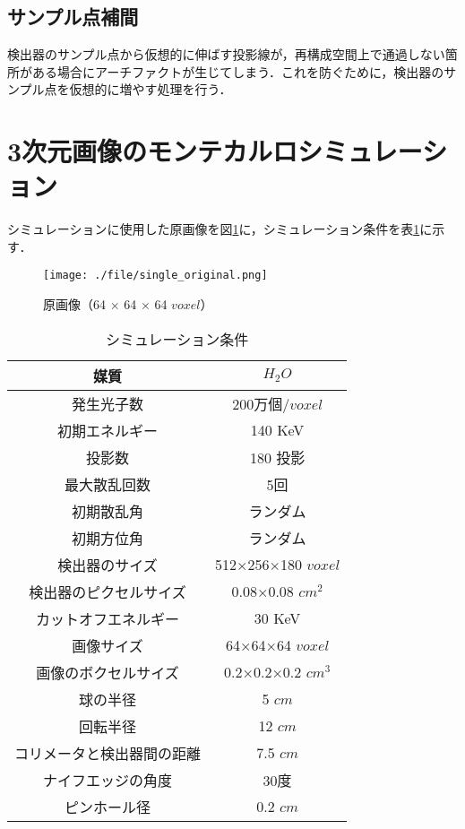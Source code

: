 \documentclass[dvipdfmx,autodetect-engine,twocolumn,10pt]{jsarticle}%
\begin{document}
\subsection{サンプル点補間}
検出器のサンプル点から仮想的に伸ばす投影線が，再構成空間上で通過しない箇所がある場合にアーチファクトが生じてしまう．これを防ぐために，検出器のサンプル点を仮想的に増やす処理を行う．

\newpage

\section{3次元画像のモンテカルロシミュレーション}
シミュレーションに使用した原画像を図\ref{original_img}に，シミュレーション条件を表\ref{simu_cond}に示す．

\begin{figure}[htbp]
  \begin{center}
    \texttt{[image: ./file/single\_original.png]}\\
    \caption{原画像（64 × 64 × 64 $voxel$）}
    \label{original_img}
  \end{center}
\end{figure}

\begin{table}[htbp]
  \begin{center}
    \caption{シミュレーション条件}
    \label{simu_cond}
    \small
    \begin{tabular}{|c|c|} \hline
      媒質 & $H_2O$ \\ \hline
      発生光子数 & 200万個/$voxel$ \\ \hline
      初期エネルギー & 140 KeV \\ \hline
      投影数 & 180 投影 \\ \hline
      最大散乱回数 & 5回 \\ \hline
      初期散乱角 & ランダム \\ \hline
      初期方位角 & ランダム \\ \hline
      検出器のサイズ & 512×256×180 $voxel$ \\ \hline
      検出器のピクセルサイズ & 0.08×0.08 $cm^2$ \\ \hline
      カットオフエネルギー & 30 KeV \\ \hline
      画像サイズ & 64×64×64 $voxel$ \\ \hline
      画像のボクセルサイズ & 0.2×0.2×0.2 $cm^3$ \\ \hline
      球の半径 & 5 $cm$ \\ \hline
      回転半径 & 12 $cm$ \\ \hline
      コリメータと検出器間の距離 & 7.5 $cm$ \\ \hline
      ナイフエッジの角度 & 30度 \\ \hline
      ピンホール径 & 0.2 $cm$ \\ \hline
    \end{tabular}
  \end{center}
\end{table}
\end{document}

